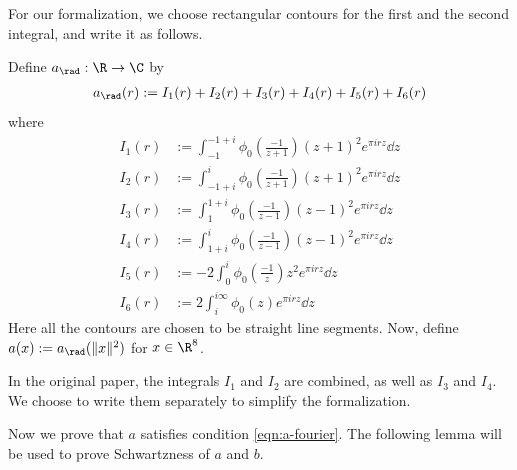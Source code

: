 For our formalization, we choose rectangular contours for the first and the second integral, and write it as follows.
\begin{definition}\label{def:a-definition}\leanok
{}
Define $a_{\rad} : \R \to \C$ by
\begin{align}\label{eqn:a-rad-definition}
    a_\rad(r) := I_1(r) + I_2(r) + I_3(r) + I_4(r) + I_5(r) + I_6(r)
\end{align}
where
\begin{align}
    I_1(r) &:= \int_{-1}^{-1 + i} \phi_0 \left(\frac{-1}{z+1}\right) (z + 1)^2 e^{\pi i r z} \dd z \label{eqn:a-I1} \\
    I_2(r) &:= \int_{-1 + i}^{i} \phi_0 \left(\frac{-1}{z+1}\right) (z + 1)^2 e^{\pi i r z} \dd z \label{eqn:a-I2} \\
    I_3(r) &:= \int_{1}^{1 + i} \phi_0 \left(\frac{-1}{z-1}\right) (z - 1)^2 e^{\pi i r z} \dd z \label{eqn:a-I3} \\
    I_4(r) &:= \int_{1 + i}^{i} \phi_0 \left(\frac{-1}{z-1}\right) (z - 1)^2 e^{\pi i r z} \dd z \label{eqn:a-I4} \\
    I_5(r) &:= -2 \int_{0}^{i} \phi_0 \left(\frac{-1}{z}\right) z^2 e^{\pi i r z} \dd z \label{eqn:a-I5} \\
    I_6(r) &:= 2 \int_{i}^{i\infty} \phi_0(z) e^{\pi i r z} \dd z \label{eqn:a-I6}
\end{align}
Here all the contours are chosen to be straight line segments.
Now, define $a(x) := a_{\rad}(\|x\|^2)$ for $x \in \R^8$.
\end{definition}
In the original paper, the integrals $I_1$ and $I_2$ are combined, as well as $I_3$ and $I_4$.
We choose to write them separately to simplify the formalization.

Now we prove that $a$ satisfies condition \eqref{eqn:a-fourier}.
The following lemma will be used to prove Schwartzness of $a$ and $b$.


